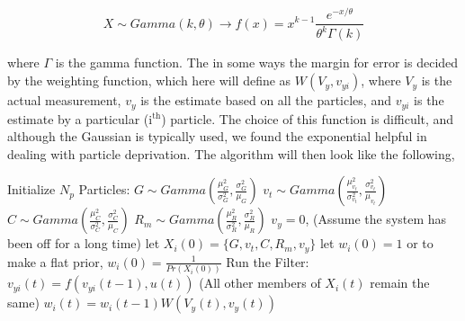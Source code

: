 \begin{equation}
X \sim Gamma(k, \theta) \rightarrow f(x) = x^{k-1}\frac{e^{-x/\theta}}{\theta^k\Gamma(k)}
\end{equation}

where $\Gamma$ is the gamma function.
The in some ways the margin for error is decided by the weighting function, which
here will define as $W(V_y, v_{yi})$, where $V_y$ is the actual measurement, $v_y$ is the 
estimate based on all the particles, and 
$v_{yi}$ is the estimate by a particular (i$^{\text{th}}$) particle. The choice of this function is difficult,
and although the Gaussian is typically used, we found the exponential helpful
in dealing with particle deprivation.  The algorithm will then look like the following,

\begin{algorithmic}
\STATE Initialize $N_p$ Particles:
    \STATE $G \sim Gamma(\frac{\mu^2_G}{\sigma^2_G}, \frac{\sigma^2_G}{\mu_G})$
    \STATE $v_t \sim Gamma(\frac{\mu^2_{v_t}}{\sigma^2_{v_t}}, \frac{\sigma^2_{v_t}}{\mu_{v_t}})$
    \STATE $C \sim Gamma(\frac{\mu^2_C}{\sigma^2_C}, \frac{\sigma^2_C}{\mu_C})$
    \STATE $R_m \sim Gamma(\frac{\mu^2_R}{\sigma^2_R}, \frac{\sigma^2_R}{\mu_R})$
    \STATE $v_y = 0$, (Assume the system has been off for a long time)
    \STATE let $X_i(0) = \{G, v_t, C, R_m, v_y\}$
    \STATE let $w_i(0) = 1$ or to make a flat prior, $w_i(0) = \frac{1}{Pr(X_i(0))}$ 
\ENDFOR
\STATE Run the Filter:
        \STATE $v_{yi}(t) = f(v_{yi}(t-1), u(t))$
        \STATE (All other members of $X_i(t)$ remain the same)
        \STATE $w_i(t) = w_i(t-1)W(V_y(t), v_y(t))$
    \ENDFOR
\ENDFOR
\end{algorithmic}

